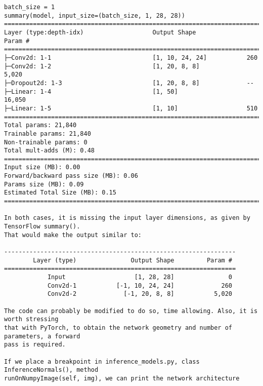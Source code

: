 \begin{verbatim}
batch_size = 1
summary(model, input_size=(batch_size, 1, 28, 28))
==========================================================================================
Layer (type:depth-idx)                   Output Shape              Param #
==========================================================================================
├─Conv2d: 1-1                            [1, 10, 24, 24]           260
├─Conv2d: 1-2                            [1, 20, 8, 8]             5,020
├─Dropout2d: 1-3                         [1, 20, 8, 8]             --
├─Linear: 1-4                            [1, 50]                   16,050
├─Linear: 1-5                            [1, 10]                   510
==========================================================================================
Total params: 21,840
Trainable params: 21,840
Non-trainable params: 0
Total mult-adds (M): 0.48
==========================================================================================
Input size (MB): 0.00
Forward/backward pass size (MB): 0.06
Params size (MB): 0.09
Estimated Total Size (MB): 0.15
==========================================================================================

In both cases, it is missing the input layer dimensions, as given by TensorFlow summary().
That would make the output similar to:

----------------------------------------------------------------
        Layer (type)               Output Shape         Param #
================================================================
            Input                   [1, 28, 28]               0
            Conv2d-1           [-1, 10, 24, 24]             260
            Conv2d-2             [-1, 20, 8, 8]           5,020
            
The code can probably be modified to do so, time allowing. Also, it is worth stressing
that with PyTorch, to obtain the network geometry and number of parameters, a forward
pass is required.

If we place a breakpoint in inference_models.py, class InferenceNormals(), method
runOnNumpyImage(self, img), we can print the network architecture


\end{verbatim}

